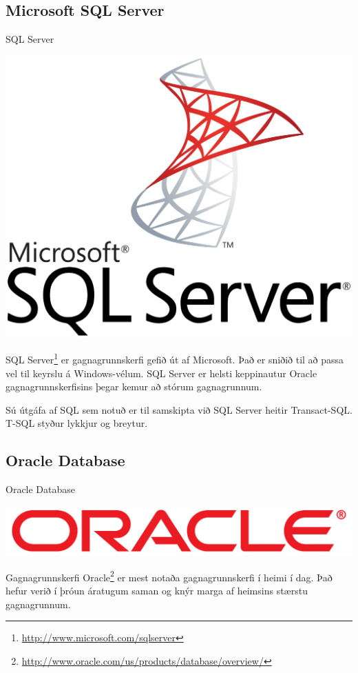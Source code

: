 \subsection{Microsoft SQL Server}
\begin{marginfigure}
\caption{SQL Server}
\label{mynd:sql-server}
\centering
\includegraphics[width=\linewidth]{myndir/sql-server}
\end{marginfigure}
SQL Server\footnote{\url{http://www.microsoft.com/sqlserver}} er gagnagrunnskerfi gefið út af Microsoft. Það er sniðið til að passa vel til keyrslu á Windows-vélum. SQL Server er helsti keppinautur Oracle gagnagrunnskerfisins þegar kemur að stórum gagnagrunnum.

Sú útgáfa af SQL sem notuð er til samskipta við SQL Server heitir Transact-SQL. T-SQL styður lykkjur og breytur.
\subsection{Oracle Database}
\label{undirkafli:oracle}
\begin{marginfigure}
\caption{Oracle Database}
\label{mynd:oracle}
\centering
\includegraphics[width=\linewidth]{myndir/oracle}
\end{marginfigure}
Gagnagrunnskerfi Oracle\footnote{\url{http://www.oracle.com/us/products/database/overview/}} er mest notaða gagnagrunnskerfi í heimi í dag. Það hefur verið í þróun áratugum saman og knýr marga af heimsins stærstu gagnagrunnum.

